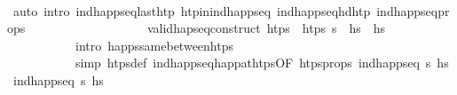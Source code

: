 \begin{isabellebody}
\ \ \isamarkupfalse%
\ {\isacharparenleft}{\kern0pt}auto\ intro{\isacharbang}{\kern0pt}{\isacharcolon}{\kern0pt}\ ind{\isacharunderscore}{\kern0pt}happ{\isacharunderscore}{\kern0pt}seq{\isacharunderscore}{\kern0pt}last{\isacharunderscore}{\kern0pt}htp\ htp{\isacharunderscore}{\kern0pt}in{\isacharunderscore}{\kern0pt}ind{\isacharunderscore}{\kern0pt}happ{\isacharunderscore}{\kern0pt}seq\ ind{\isacharunderscore}{\kern0pt}happ{\isacharunderscore}{\kern0pt}seq{\isacharunderscore}{\kern0pt}hd{\isacharunderscore}{\kern0pt}htp\ ind{\isacharunderscore}{\kern0pt}happ{\isacharunderscore}{\kern0pt}seq{\isacharunderscore}{\kern0pt}props{\isacharparenleft}{\kern0pt}{}{\isacharparenright}{\kern0pt}\isanewline
\ \ \ \ \ \ \ \ \ \ \ \ \ \ \ \ \ \ \ valid{\isacharunderscore}{\kern0pt}hap{\isacharunderscore}{\kern0pt}seq{\isacharunderscore}{\kern0pt}construct{\isacharbrackleft}{\kern0pt}\ htps\ {\isacharequal}{\kern0pt}\ {\isachardoublequoteopen}htps{\isacharprime}{\kern0pt}\ {\isasympi}s{\isachardoublequoteclose}\ \ hs\ {\isacharequal}{\kern0pt}\ {\isachardoublequoteopen}hs{\isachardoublequoteclose}{\isacharbrackright}{\kern0pt}\isanewline
\ \ \ \ \ \ \ \ \ \ \ intro{\isacharcolon}{\kern0pt}\ happs{\isacharunderscore}{\kern0pt}same{\isacharunderscore}{\kern0pt}between{\isacharunderscore}{\kern0pt}htps\isanewline
\ \ \ \ \ \ \ \ \ \ \ simp{\isacharcolon}{\kern0pt}\ htps{\isacharprime}{\kern0pt}{\isacharunderscore}{\kern0pt}def\ ind{\isacharunderscore}{\kern0pt}happ{\isacharunderscore}{\kern0pt}seq{\isacharunderscore}{\kern0pt}happ{\isacharunderscore}{\kern0pt}at{\isacharunderscore}{\kern0pt}htps{\isacharprime}{\kern0pt}{\isacharbrackleft}{\kern0pt}OF\ htps{\isacharunderscore}{\kern0pt}props\ {\isacartoucheopen}ind{\isacharunderscore}{\kern0pt}happ{\isacharunderscore}{\kern0pt}seq\ {\isasympi}s\ hs{\isacartoucheclose}\ {\isacartoucheopen}ind{\isacharunderscore}{\kern0pt}happ{\isacharunderscore}{\kern0pt}seq\ {\isasympi}s\ hs{\isacharprime}{\kern0pt}{\isacartoucheclose}{\isacharbrackright}{\kern0pt}{\isacharparenright}{\kern0pt}%
\endisatagproof
{\isafoldproof}%
%
\isadelimproof
\isanewline
%
\endisadelimproof
\isanewline
{}\isamarkupfalse%
\isanewline
%
\isadelimtheory
\isanewline
%
\endisadelimtheory
%
\isatagtheory
{}\isamarkupfalse%
\ %
%
\endisatagtheory
{\isafoldtheory}%
%
\isadelimtheory
%
\endisadelimtheory
%
\end{isabellebody}%
\endinput
